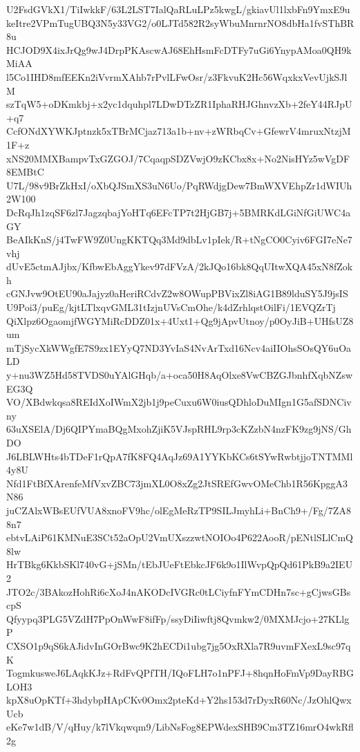 U2FsdGVkX1/TiIwkkF/63L2LST7IalQaRLuLPz5kwgL/gkiavUl1lxbFn9YmxE9u
keItre2VPmTugUBQ3N5y33VG2/o0LJTd582R2syWbuMnrnrNO8dbHa1fvSThBR8u
HCJOD9X4ixJrQg9wJ4DrpPKAscwAJ68EhHsmFcDTFy7uGi6YnypAMoa0QH9kMiAA
l5Co1IHD8mfEEKn2iVvrmXAhb7rPvlLFwOsr/z3FkvuK2Hc56WqxkxVevUjkSJlM
szTqW5+oDKmkbj+x2yc1dquhpl7LDwDTzZR1IphaRHJGhnvzXb+2feY44RJpU+q7
CcfONdXYWKJptnzk5xTBrMCjaz713a1b+nv+zWRbqCv+GfewrV4mruxNtzjM1F+z
xNS20MMXBampvTxGZGOJ/7CqaqpSDZVwjO9zKCbx8x+No2NisHYz5wVgDF8EMBtC
U7L/98v9BrZkHxI/oXbQJSmXS3uN6Uo/PqRWdjgDew7BmWXVEhpZr1dWIUh2W100
DcRqJh1zqSF6zl7JagzqbajYoHTq6EFcTP7t2HjGB7j+5BMRKdLGiNfGiUWC4aGY
BeAIkKnS/j4TwFW9Z0UngKKTQq3Md9dbLv1pIek/R+tNgCO0Cyiv6FGI7eNe7vhj
dUvE5ctmAJjbx/KfbwEbAggYkev97dFVzA/2kJQo16bk8QqUItwXQA45xN8fZokh
cGNJvw9OtEU90aJajyz0aHeriRCdvZ2w8OWupPBVixZl8iAG1B89lduSY5J9jsIS
U9Poi3/puEg/kjtLTlxqvGML31tIzjnUVsCmOhe/k4dZrhlqstOilFi/1EVQZrTj
QiXlpz6OgaomjfWGYMiRcDDZ01x+4Uxt1+Qg9jApvUtnoy/p0OyJiB+UHfsUZ8um
mTjSycXkWWgfE7S9zx1EYyQ7ND3YvIaS4NvArTxd16Ncv4aiIIOhsSOsQY6uOaLD
y+nu3WZ5Hd58TVDS0uYAlGHqb/a+oca50H8AqOlxe8VwCBZGJbnhfXqbNZswEG3Q
VO/XBdwkqsa8REIdXoIWmX2jb1j9peCuxu6W0iusQDhloDuMIgn1G5afSDNCivny
63uXSElA/Dj6QIPYmaBQgMxohZjiK5VJspRHL9rp3cKZzbN4nzFK9zg9jNS/GhDO
J6LBLWHts4bTDeF1rQpA7fK8FQ4AqJz69A1YYKbKCs6tSYwRwbtjjoTNTMMl4y8U
Nfd1FtBfXArenfeMfVxvZBC73jmXL0O8xZg2JtSREfGwvOMeChb1R56KpggA3N86
juCZAlxWBsEUfVUA8xnoFV9hc/olEgMeRzTP9SILJmyhLi+BnCh9+/Fg/7ZA88n7
ebtvLAiP61KMNuE3SCt52aOpU2VmUXszzwtNOIOo4P622AooR/pENtlSLlCmQ8lw
HrTBkg6KkbSKl740vG+jSMn/tEbJUeFtEbkcJF6k9o1IlWvpQpQd61PkB9a2IEU2
JTO2c/3BAkozHohRi6cXoJ4nAKODcIVGRc0tLCiyfnFYmCDHn7sc+gCjwsGBscpS
Qfyypq3PLG5VZdH7PpOnWwF8ifFp/ssyDiIiwftj8Qvmkw2/0MXMJcjo+27KLlgP
CXSO1p9qS6kAJidvInGOrBwc9K2hECDi1ubg7jg5OxRXla7R9uvmFXexL9sc97qK
TogmkusweJ6LAqkKJz+RdFvQPfTH/IQoFLH7o1nPFJ+8hqnHoFmVp9DayRBGLOH3
kpX8uOpKTf+3hdybpHApCKv0Omx2pteKd+Y2hs153d7rDyxR60Nc/JzOhlQwxUcb
eKe7w1dB/V/qHuy/k7lVkqwqm9/LibNsFog8EPWdexSHB9Cm3TZ16mrO4wkRfl2g
